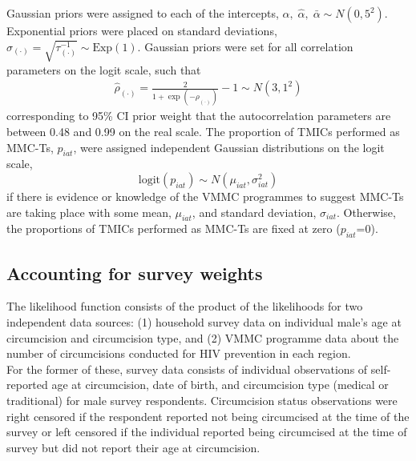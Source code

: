 \documentclass{article}
\begin{document}
\begin{appendix}
\noindent Gaussian priors were assigned to each of the intercepts, $\alpha, \;\hat{\alpha}, \;\bar{\alpha} \sim N(0, 5^2)$. Exponential priors were placed on standard deviations, $\sigma_{(\cdot)} = \sqrt{\tau^{-1}_{(\cdot)}} \sim \text{Exp}(1)$. Gaussian priors were set for all correlation parameters on the logit scale, such that 
\begin{align*} 
  \hat{\rho}_{(\cdot)} = \frac{2}{1 + \exp(-\rho_{(\cdot)})} - 1 \sim N(3, 1^2)
\end{align*}
corresponding to 95\% CI prior weight that the autocorrelation parameters are between 0.48 and 0.99 on the real scale. The proportion of TMICs performed as MMC-Ts, $p_{iat}$, were assigned independent Gaussian distributions on the logit scale, 
\begin{equation*} 
  	\text{logit}(p_{iat}) \sim N(\mu_{iat}, \sigma_{iat}^2) 
\end{equation*}
if there is evidence or knowledge of the VMMC programmes to suggest MMC-Ts are taking place with some mean, $\mu_{iat}$, and standard deviation, $\sigma_{iat}$. Otherwise, the proportions of TMICs performed as MMC-Ts are fixed at zero ($p_{iat}$=0).


\subsection{Accounting for survey weights}


The likelihood function consists of the product of the likelihoods for two independent data sources: (1) household survey data on individual male's age at circumcision and circumcision type, and (2) VMMC programme data about the number of circumcisions conducted for HIV prevention in each region.\\

\noindent For the former of these, survey data consists of individual observations of self-reported age at circumcision, date of birth, and circumcision type (medical or traditional) for male survey respondents. Circumcision status observations were right censored if the respondent reported not being circumcised at the time of the survey or left censored if the individual reported being circumcised at the time of survey but did not report their age at circumcision.\\


\end{appendix}
\end{document}
